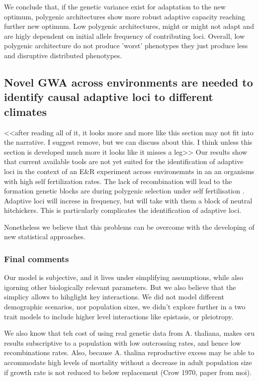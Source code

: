 \documentclass{article}
\begin{document}
We conclude that, if the genetic variance exist for adaptation to the new optimum, polygenic architectures show more robust adaptive capacity reaching further new optimum. Low polygenic architectures, might or might not adapt and are higly dependent on initial allele frequency of contributing loci. Overall, low polygenic architecture do not produce 'worst' phenotypes they just produce less and disruptive distributed phenotypes. 

\subsection{Novel GWA across environments are needed to identify causal adaptive loci to different climates}
<<after reading all of it, it looks more and more like this section may not fit into the narrative. I suggest remove, but we can discuss about this. I think unless this section is developed much more it looks like it misses a leg>>
Our results show that current available tools are not yet suited for the identification of adaptive loci in the context of an E\&R experiment across environemnts in an an organisms with high self fertilization rates. 
The lack of recombination will lead to the formation genetic blocks are during polygenic selection under self fertilisation \citep{Hartfield2022-nc}. Adaptive loci will increse in frequency, but will take with them a block of neutral hitchickers. This is particularly complicates the identification of adaptive loci. 

Nonetheless we believe that this problems can be overcome with the developing of new statistical approaches. 

\subsubsection{Final comments}
Our model is subjective, and it lives under simplifying  assumptions, while also igorning other biologically relevant parameters. But we also believe that the simplicy allows to hihglight key interactions. We did not model different demographic scenarios, nor population sixes, we didn't explore further in a two trait models to include higher level interactions like epistasis, or pleiotropy. 

We also know that teh cost of using real genetic data from A. thaliana, makes oru results subscriptive to a population with low outcrossing rates, and hence low recombinations rates. Also, because A. thalina  reproductive excess may be able to accommodate high levels of mortality without a decrease in adult population size if growth rate is not reduced to below replacement (Crow 1970, paper from moi).
\end{document}
